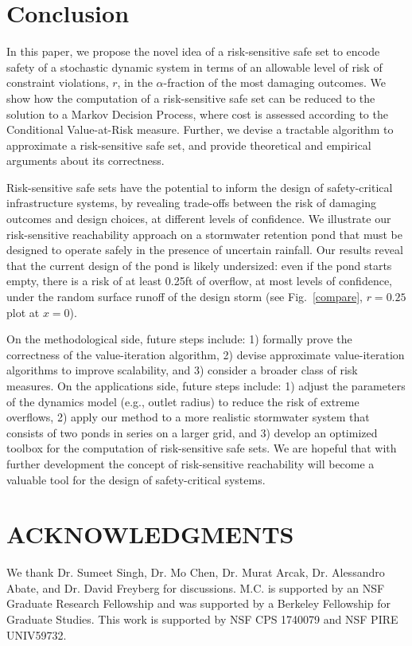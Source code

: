 \documentclass[letterpaper, 10 pt, conference]{ieeeconf}  %
\begin{document}
\section{Conclusion}\label{conc}
In this paper, we propose the novel idea of a risk-sensitive safe set
to encode safety of a stochastic dynamic system in terms of an allowable level of risk of constraint violations, $r$, 
in the $\alpha$-fraction of the most damaging outcomes.
We show how the computation of a risk-sensitive safe set can be
reduced to the solution to a Markov Decision Process, where cost is assessed according to the Conditional Value-at-Risk measure. 
Further, we devise a tractable algorithm to approximate a risk-sensitive safe set, and provide theoretical and empirical arguments about its correctness.

Risk-sensitive safe sets have the potential to inform the design of safety-critical infrastructure systems,
by revealing trade-offs between the risk of damaging outcomes and design choices, at different levels of confidence.
We illustrate our risk-sensitive reachability approach on a stormwater retention pond that must be designed to operate safely in the presence of uncertain rainfall. 
Our results reveal that the current design of the pond is likely undersized: even if the pond starts empty, 
there is a risk of at least 0.25ft of overflow, at most levels of confidence, 
under the random surface runoff of the design storm (see Fig.~\ref{compare}, $r=0.25$ plot at $x=0$).

On the methodological side, future steps include: 1) formally prove the correctness of the value-iteration algorithm, 
2) devise approximate value-iteration algorithms to improve scalability, and 3) consider a broader class of risk measures. 
On the applications side, future steps include: 1) adjust the parameters of the dynamics model (e.g., outlet radius) to reduce the risk of extreme overflows, 
2) apply our method to a more realistic stormwater system that consists of two ponds in series on a larger grid,
and 3) develop an optimized toolbox for the computation of risk-sensitive safe sets.  
We are hopeful that with further development the concept of risk-sensitive reachability will become a valuable tool for the design of safety-critical systems.

\section*{ACKNOWLEDGMENTS}
We thank Dr. Sumeet Singh, Dr. Mo Chen, Dr. Murat Arcak, Dr. Alessandro Abate, and Dr. David Freyberg for discussions. 
M.C. is supported by an NSF Graduate Research Fellowship and was supported by a Berkeley Fellowship for Graduate Studies. 
This work is supported by NSF CPS 1740079 and NSF PIRE UNIV59732.
\end{document}
